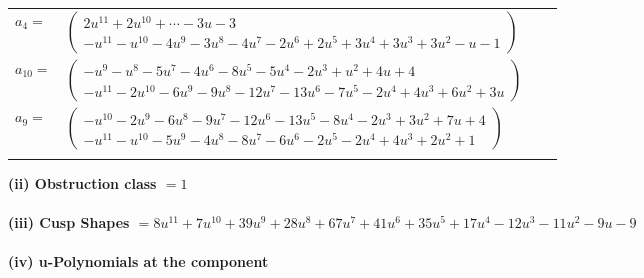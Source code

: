\documentclass[1p]{elsarticle_modified}
\theoremstyle{definition}
\begin{document}
\begin{tabular}{m{7pt} m{180pt} m{7pt} m{180pt} }
\flushright $a_{4}=$&$\begin{pmatrix}2 u^{11}+2 u^{10}+\cdots-3 u-3\\- u^{11}- u^{10}-4 u^9-3 u^8-4 u^7-2 u^6+2 u^5+3 u^4+3 u^3+3 u^2- u-1\end{pmatrix}$ \\
\flushright $a_{10}=$&$\begin{pmatrix}- u^9- u^8-5 u^7-4 u^6-8 u^5-5 u^4-2 u^3+u^2+4 u+4\\- u^{11}-2 u^{10}-6 u^9-9 u^8-12 u^7-13 u^6-7 u^5-2 u^4+4 u^3+6 u^2+3 u\end{pmatrix}$ \\
\flushright $a_{9}=$&$\begin{pmatrix}- u^{10}-2 u^9-6 u^8-9 u^7-12 u^6-13 u^5-8 u^4-2 u^3+3 u^2+7 u+4\\- u^{11}- u^{10}-5 u^9-4 u^8-8 u^7-6 u^6-2 u^5-2 u^4+4 u^3+2 u^2+1\end{pmatrix}$\\&\end{tabular}
\flushleft \textbf{(ii) Obstruction class $= 1$}\\~\\
\flushleft \textbf{(iii) Cusp Shapes $= 8 u^{11}+7 u^{10}+39 u^9+28 u^8+67 u^7+41 u^6+35 u^5+17 u^4-12 u^3-11 u^2-9 u-9$}\\~\\
\newpage\renewcommand{\arraystretch}{1}
\flushleft \textbf{(iv) u-Polynomials at the component}\newline \\
\end{document}
